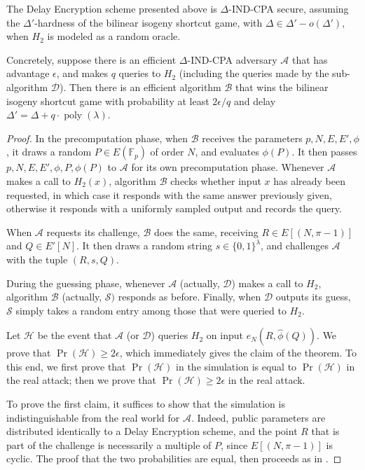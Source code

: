 \documentclass{llncs}
\newcommand{\F}{\mathbb{F}}
\DeclareMathOperator{\poly}{poly}
\begin{document}
\begin{theorem}
  The Delay Encryption scheme presented above is $\Delta$-IND-CPA
  secure, assuming the $\Delta'$-hardness of the bilinear isogeny
  shortcut game, with $\Delta\in\Delta' - o(\Delta')$, when $H_2$ is
  modeled as a random oracle.

  Concretely, suppose there is an efficient $\Delta$-IND-CPA adversary
  $\mathcal{A}$ that has advantage $\epsilon$, and makes $q$ queries
  to $H_2$ (including the queries made by the sub-algorithm
  $\mathcal{D}$). Then there is an efficient algorithm $\mathcal{B}$
  that wins the bilinear isogeny shortcut game with probability at
  least $2\epsilon/q$ and delay $\Delta' = \Delta + q\cdot\poly(\lambda)$.
\end{theorem}
\begin{proof}
  In the precomputation phase, when $\mathcal{B}$ receives the
  parameters $p,N,E,E',\phi$, it draws a random $P\in E(\F_p)$ of
  order $N$, and evaluates $\phi(P)$. %
  It then passes $p,N,E,E',\phi,P,\phi(P)$ to $\mathcal{A}$ for its
  own precomputation phase. %
  Whenever $\mathcal{A}$ makes a call to $H_2(x)$, algorithm
  $\mathcal{B}$ checks whether input $x$ has already been requested,
  in which case it responds with the same answer previously given,
  otherwise it responds with a uniformly sampled output and records
  the query.

  When $\mathcal{A}$ requests its challenge, $\mathcal{B}$ does the
  same, receiving $R\in E[(N,\pi-1)]$ and $Q\in E'[N]$. %
  It then draws a random string $s\in\{0,1\}^\lambda$, and challenges
  $\mathcal{A}$ with the tuple $(R,s,Q)$.

  During the guessing phase, whenever $\mathcal{A}$ (actually,
  $\mathcal{D}$) makes a call to $H_2$, algorithm $\mathcal{B}$
  (actually, $\mathcal{S})$ responds as before. %
  Finally, when $\mathcal{D}$ outputs its guess, $\mathcal{S}$ simply
  takes a random entry among those that were queried to $H_2$.

  Let $\mathcal{H}$ be the event that $\mathcal{A}$ (or $\mathcal{D}$)
  queries $H_2$ on input $e_N(R,\hat\phi(Q))$. %
  We prove that $\Pr(\mathcal{H}) \ge 2\epsilon$, which immediately
  gives the claim of the theorem. %
  To this end, we first prove that $\Pr(\mathcal{H})$ in the
  simulation is equal to $\Pr(\mathcal{H})$ in the real attack; then
  we prove that $\Pr(\mathcal{H})\ge 2\epsilon$ in the real attack.

  To prove the first claim, it suffices to show that the simulation is
  indistinguishable from the real world for $\mathcal{A}$. %
  Indeed, public parameters are distributed identically to a Delay
  Encryption scheme, and the point $R$ that is part of the challenge
  is necessarily a multiple of $P$, since $E[(N,\pi-1)]$ is cyclic. %
  The proof that the two probabilities are equal, then proceeds as in
  \cite[Lemma~4.3, Claim~1]{doi:10.1137/S0097539701398521}.


\end{proof}
\end{document}
